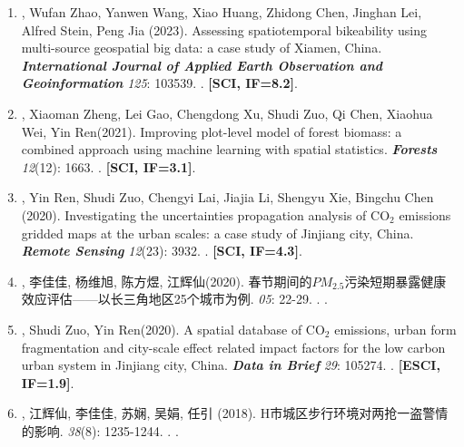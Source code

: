\begin{enumerate}
    \Shaoqing, Ge Qiu, Yuchen Li, Shuhan Yang, Shujuan Yang, Peng Jia\CS (2024).
    State of the art of lifecourse cohort establishment. 
    \textbf{\textit{China CDC Weekly}} 6(14), 300–304.
    . 
    \textbf{[SCI/SSCI, IF=3.5]}.
\item
    \Shaoqing, Wufan Zhao\CS, Yanwen Wang, Xiao Huang, Zhidong Chen, Jinghan Lei, Alfred Stein, Peng Jia (2023).
    Assessing spatiotemporal bikeability using multi-source geospatial big data: a case study of Xiamen, China. 
    \textbf{\textit{International Journal of Applied Earth Observation and Geoinformation}} \textit{125}: 103539.
    . 
    \textbf{[SCI, IF=8.2]}.
\item
    \Shaoqing\CF, Xiaoman Zheng\CF, Lei Gao, Chengdong Xu, Shudi Zuo, Qi Chen, Xiaohua Wei, Yin Ren\CS (2021).
    Improving plot-level model of forest biomass: a combined approach using machine learning with spatial statistics.
    \textbf{\textit{Forests}} \textit{12}(12): 1663.
    . 
    \textbf{[SCI, IF=3.1]}.
\item
    \Shaoqing\CF, Yin Ren\CF, Shudi Zuo\CS, Chengyi Lai, Jiajia Li, Shengyu Xie, Bingchu Chen (2020).
    Investigating the uncertainties propagation analysis of CO$_2$ emissions gridded maps at the urban scales: a case study of Jinjiang city, China. 
    \textbf{\textit{Remote Sensing}} \textit{12}(23): 3932.
    . 
    \textbf{[SCI, IF=4.3]}.
\item
    {}, 李佳佳, 杨维旭, 陈方煜, 江辉仙\CS(2020).
    春节期间的$PM_{2.5}$污染短期暴露健康效应评估——以长三角地区25个城市为例.
    \textbf{} \textit{05}: 22-29.
    . 
    \textbf{}.
\item
    \Shaoqing, Shudi Zuo, Yin Ren\CS (2020).
    A spatial database of CO$_2$ emissions, urban form fragmentation and city-scale effect related impact factors for the low carbon urban system in Jinjiang city, China.
    \textbf{\textit{Data in Brief}} \textit{29}: 105274.
    . 
    \textbf{[ESCI, IF=1.9]}.
\item
    {}, 江辉仙\CS, 李佳佳, 苏娴, 吴娟, 任引 (2018).
	H市城区步行环境对两抢一盗警情的影响.
    \textbf{} \textit{38}(8): 1235-1244.
    . 
    \textbf{}.

\end{enumerate}

